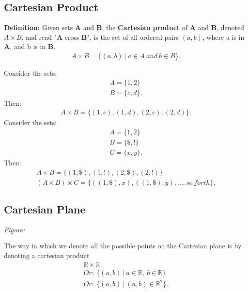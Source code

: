 \documentclass{report}
\begin{document}
    \subsection{Cartesian Product}
    \bigbreak \noindent 
    \begin{mdframed}
        \textbf{Definition:}
        Given sets \textbf{A} and \textbf{B}, the \textbf{Cartesian product} of \textbf{A} and \textbf{B}, denoted $A \times B$, and read "\textbf{A} cross \textbf{B}", is the set of all ordered pairs $(a,b)$, where a is in \textbf{A}, and b is in \textbf{B}.
        \begin{align*}
            A \times B = \{(a,b)\ |\ a \in A\ and\ b \in B\}
        .\end{align*}
    \end{mdframed}
    \bigbreak \noindent 
    Consider the sets:
    \begin{align*}
        A = \{1,2\} \\
        B = \{c,d\}
    .\end{align*}
    Then:
    \begin{align*}
        A \times B = \{(1,c), (1,d), (2,c), (2,d)\}
    .\end{align*}
    \bigbreak \noindent 
    Consider the sets:
    \begin{align*}
        A = \{1,2\} \\
        B = \{\$,!\} \\
        C = \{x,y\}
    .\end{align*}
    Then:
    \begin{align*}
        A \times B = \{(1,\$),(1,!), (2,\$), (2,!)\} \\
        (A \times B) \times C = \{((1,\$), x), ((1,\$),y), ..., so\ forth\}
    .\end{align*}

    \bigbreak \noindent \bigbreak \noindent 
    \subsection{Cartesian Plane}
    \bigbreak \noindent 
    \textit{Figure:}
    \begin{figure}[ht]
        \centering
        \label{fig:test}
    \end{figure}
    \bigbreak \noindent 
    The way in which we denote all the possible points on the Cartesian plane is by denoting a cartesian product
    \begin{align*}
        \mathbb{R} \times \mathbb{R} \\
        Or:\ \{(a,b)\ |\ a \in \mathbb{R},\ b \in \mathbb{R}\} \\
        Or:\ \{(a,b)\ |\ (a,b) \in \mathbb{R}^{2}\}
    .\end{align*}
\end{document}
